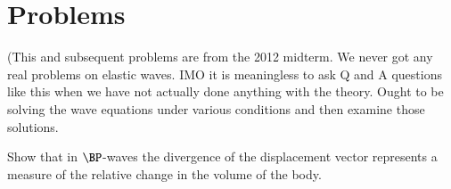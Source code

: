 % 
% 
% 
% 
% 
% 
% 
% 
% 
% 
% 
% 
\section{Problems}

\begin{Exercise}[title={$\BP$-waves, $\BS$-waves, and Love-waves}, label={problem:elastic:displacements:midtermQ1a}]

(This and subsequent problems are from the 2012 midterm.  We never got any real problems on elastic waves.  IMO it is meaningless to ask Q and A questions like this when we have not actually done anything with the theory.  Ought to be solving the wave equations under various conditions and then examine those solutions.

Show that in $\BP$-waves the divergence of the displacement vector represents a measure of the relative change in the volume of the body.
\end{Exercise}

